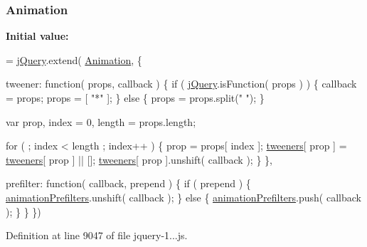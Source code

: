 \subsubsection[{Animation}]{ Animation}\label{_scripts_2jquery-1_810_82_8js_a3299b781c8ec8287357326920ab3565a}
{\bfseries Initial value\+:}
\begin{DoxyCode}
= \hyperlink{obj_2_release_2_package_2_package_tmp_2_scripts_2jquery-1_810_82_8js_a5e01048fbd3a30b44e8d491d8945c457}{jQuery}.extend( \hyperlink{obj_2_release_2_package_2_package_tmp_2_scripts_2jquery-1_810_82_8js_a3299b781c8ec8287357326920ab3565a}{Animation}, \{

    tweener: \textcolor{keyword}{function}( props, callback ) \{
        \textcolor{keywordflow}{if} ( \hyperlink{obj_2_release_2_package_2_package_tmp_2_scripts_2jquery-1_810_82_8js_a5e01048fbd3a30b44e8d491d8945c457}{jQuery}.isFunction( props ) ) \{
            callback = props;
            props = [ \textcolor{stringliteral}{"*"} ];
        \} \textcolor{keywordflow}{else} \{
            props = props.split(\textcolor{stringliteral}{" "});
        \}

        var prop,
            index = 0,
            length = props.length;

        \textcolor{keywordflow}{for} ( ; index < length ; index++ ) \{
            prop = props[ index ];
            \hyperlink{obj_2_release_2_package_2_package_tmp_2_scripts_2jquery-1_810_82_8js_a948afd2431eec272c99689edddfb6850}{tweeners}[ prop ] = \hyperlink{obj_2_release_2_package_2_package_tmp_2_scripts_2jquery-1_810_82_8js_a948afd2431eec272c99689edddfb6850}{tweeners}[ prop ] || [];
            \hyperlink{obj_2_release_2_package_2_package_tmp_2_scripts_2jquery-1_810_82_8js_a948afd2431eec272c99689edddfb6850}{tweeners}[ prop ].unshift( callback );
        \}
    \},

    prefilter: \textcolor{keyword}{function}( callback, prepend ) \{
        \textcolor{keywordflow}{if} ( prepend ) \{
            \hyperlink{obj_2_release_2_package_2_package_tmp_2_scripts_2jquery-1_810_82_8js_adb3f17c5359fbc12b7043b6969553d78}{animationPrefilters}.unshift( callback );
        \} \textcolor{keywordflow}{else} \{
            \hyperlink{obj_2_release_2_package_2_package_tmp_2_scripts_2jquery-1_810_82_8js_adb3f17c5359fbc12b7043b6969553d78}{animationPrefilters}.push( callback );
        \}
    \}
\})
\end{DoxyCode}


Definition at line 9047 of file jquery-\/1...\+js.

